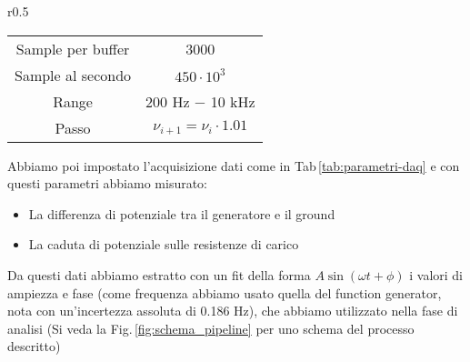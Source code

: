 \documentclass[../Relazione_circuiti]{subfiles}
\begin{document}
  \begin{wraptable}{r}{0.5\textwidth}
    \centering
    \begin{minipage}{0.43\textwidth}

      \centering
      \begin{tabular}{|c|c|}
        \hline
        Sample per buffer & 3000                           \\
        Sample al secondo & $ 450 \cdot 10^3 $                 \\
        Range             & 200 Hz − 10 kHz                \\
        Passo             & $\nu_{i+1} = \nu_i \cdot 1.01$ \\ \hline
      \end{tabular}

      \label{tab:parametri-daq}

    \end{minipage}

  \end{wraptable}

  Abbiamo poi impostato l'acquisizione dati come in Tab\,\ref{tab:parametri-daq} e con questi parametri abbiamo
  misurato:
  \begin{itemize}
    \item La differenza di potenziale tra il generatore e il ground
    \item La caduta di potenziale sulle resistenze di carico
  \end{itemize}

  Da questi dati abbiamo estratto con un fit della forma $ A \sin\left( \omega t + \phi \right) $ i valori di ampiezza e
  fase (come frequenza abbiamo usato quella del function generator, nota con un'incertezza assoluta di 0.186 Hz), che
  abbiamo utilizzato nella fase di analisi (Si veda la Fig.\,\ref{fig:schema_pipeline} per uno schema del processo
  descritto)

%
%
\end{document}
